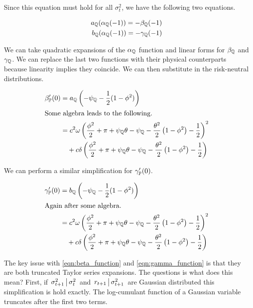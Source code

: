 \documentclass[11pt, letterpaper, twoside, final]{article}
\begin{document}
Since this equation must hold for all $\sigma_t^2$, we have the following two equations.

\begin{align}
    a_{\mathbb{Q}}(\alpha_{\mathbb{Q}}(-1)) = - \beta_{\mathbb{Q}}(-1) \\
    b_{\mathbb{Q}}(\alpha_{\mathbb{Q}}(-1)) = - \gamma_{\mathbb{Q}}(-1) 
\end{align}

We can take quadratic expansions of the $\alpha_{\mathbb{Q}}$ function and linear forms for $\beta_{\mathbb{Q}}$ and
$\gamma_{\mathbb{Q}}$. 
We can replace the last two functions with their physical counterparts because linearity implies they
coincide. 
We can then substitute in the risk-neutral distributions.


\begin{align}
    \label{eqn:beta_function}
    \beta_{\PP}'(0)  &= a_{\QQ}\left(-\psi_{\QQ} - \frac{1}{2} (1- \phi^2)\right)   \\
%
    \intertext{Some algebra leads to the following.}
%
    &= c^{2} \omega \left(\frac{\phi^{2}}{2} + \pi + \psi_{\QQ} \theta - \psi_{\QQ} - \frac{\theta^{2}}{2}
       \left(1- \phi^{2}\right) - \frac{1}{2}\right)^{2}  \\
    &\quad + c \delta \left(\frac{\phi^{2}}{2} + \pi + \psi_{\QQ} \theta - \psi_{\QQ} - \frac{\theta^{2}}{2}
      \left(1 - \phi^{2} \right) - \frac{1}{2}\right)  \nonumber
\end{align}

We can perform a similar simplification for $\gamma_{\mathbb{P}}'(0)$.

\begin{align}
    \label{eqn:gamma_function}
    \gamma_{\PP}'(0)  &= b_{\QQ}\left(-\psi_{\QQ} - \frac{1}{2} (1- \phi^2)\right)  \\
%
    \intertext{Again after some algebra.}
%
                     &= c^{2} \omega \left(\frac{\phi^{2}}{2} + \pi + \psi_{\QQ} \theta - \psi_{\QQ} -
                        \frac{\theta^{2}}{2} \left(1 - \phi^{2} \right) - \frac{1}{2}\right)^{2}   \\
                     &\quad + c \delta \left(\frac{\phi^{2}}{2} + \pi + \psi_{\QQ} \theta - \psi_{\QQ} -
                       \frac{\theta^{2}}{2} \left(1- \phi^{2}\right) - \frac{1}{2}\right) \nonumber 
\end{align}

The key issue with  \cref{eqn:beta_function} and \cref{eqn:gamma_function} is that they are both truncated Taylor
series expansions. 
The questions is what does this mean?
First, if $\left. \sigma^2_{t+1} \,\middle\vert\, \sigma^2_t \right.$ and $\left. r_{t+1} \,\middle\vert\,  \sigma^2_{t+1}\right.$
are Gaussian distributed this simplification is hold exactly.
The log-cumulant function of a Gaussian variable truncates after the first two terms.
\end{document}
